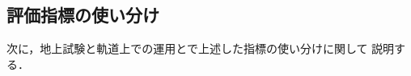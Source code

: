 \documentclass[11pt]{jsreport}
\begin{document}

\subsection{評価指標の使い分け}
次に，地上試験と軌道上での運用とで上述した指標の使い分けに関して
説明する．

\end{document}
